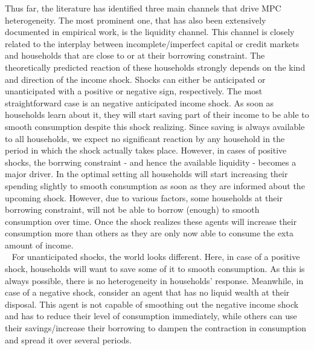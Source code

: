 Thus far, the literature has identified three main channels that drive MPC heterogeneity. The most prominent one, that has also been extensively documented in empirical work, is the liquidity channel. This channel is closely related to the interplay between incomplete/imperfect capital or credit markets and households that are close to or at their borrowing constraint. The theoretically predicted reaction of these households strongly depends on the kind and direction of the income shock. Shocks can either be anticipated or unanticipated with a positive or negative sign, respectively. The most straightforward case is an negative anticipated income shock. As soon as households learn about it, they will start saving part of their income to be able to smooth consumption despite this shock realizing. Since saving is always available to all households, we expect no significant reaction by any household in the period in which the shock actually takes place. However, in cases of positive shocks, the borrwing constraint - and hence the available liquidity - becomes a major driver. In the optimal setting all households will start increasing their spending slightly to smooth consumption as soon as they are informed about the upcoming shock. However, due to various factors, some households at their borrowing constraint, will not be able to borrow (enough) to smooth consumption over time. Once the shock realizes these agents will increase their consumption more than others as they are only now able to consume the exta amount of income. \\ 
For unanticipated shocks, the world looks different. Here, in case of a positive shock, households will want to save some of it to smooth consumption. As this is always possible, there is no heterogeneity in households' response. Meanwhile, in case of a negative shock, consider an agent that has no liquid wealth at their disposal. This agent is not capable of smoothing out the negative income shock and has to reduce their level of consumption immediately, while others can use their savings/increase their borrowing to dampen the contraction in consumption and spread it over several periods. \\ 
